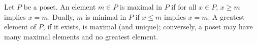 Let $P$ be a poset. An element $m \in P$ is maximal in $P$ if for all $x \in P$, $x \geq m$ implies $x = m$. Dually, $m$ is minimal in $P$ if $x \leq m$ implies $x = m$. A greatest element of $P$, if it exists, is maximal (and unique); conversely, a poset may have many maximal elements and no greatest element.
